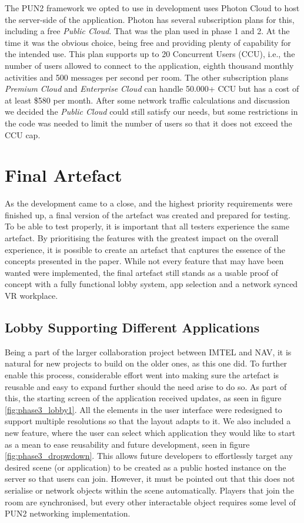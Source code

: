 The PUN2 framework we opted to use in development uses Photon Cloud to host the server-side of the application. Photon has several subscription plans for this, including a free \textit{Public Cloud}. That was the plan used in phase 1 and 2. At the time it was the obvious choice, being free and providing plenty of capability for the intended use. This plan supports up to 20 Concurrent Users (CCU), i.e., the number of users allowed to connect to the application, eighth thousand monthly activities and 500 messages per second per room. The other subscription plans \textit{Premium Cloud} and \textit{Enterprise Cloud} can handle 50.000+ CCU but has a cost of at least \$580 per month. After some network traffic calculations and discussion we decided the \textit{Public Cloud} could still satisfy our needs, but some restrictions in the code was needed to limit the number of users so that it does not exceed the CCU cap. 





\section{Final Artefact}
As the development came to a close, and the highest priority requirements were finished up, a final version of the artefact was created and prepared for testing. To be able to test properly, it is important that all testers experience the same artefact. By prioritising the features with the greatest impact on the overall experience, it is possible to create an artefact that captures the essence of the concepts presented in the paper. While not every feature that may have been wanted were implemented, the final artefact still stands as a usable proof of concept with a fully functional lobby system, app selection and a network synced VR workplace.


\subsection{Lobby Supporting Different Applications}
\label{section:lobbySystem}
Being a part of the larger collaboration project between IMTEL and NAV, it is natural for new projects to build on the older ones, as this one did. To further enable this process, considerable effort went into making sure the artefact is reusable and easy to expand further should the need arise to do so. As part of this, the starting screen of the application received updates, as seen in figure \ref{fig:phase3_lobby1}. All the elements in the user interface were redesigned to support multiple resolutions so that the layout adapts to it.  
We also included a new feature, where the user can select which application they would like to start as a mean to ease reusability and future development, seen in figure \ref{fig:phase3_dropwdown}. This allows future developers to effortlessly target any desired scene (or application) to be created as a public hosted instance on the server so that users can join. 
However, it must be pointed out that this does not serialise or network objects within the scene automatically. Players that join the room are synchronised, but every other interactable object requires some level of PUN2 networking implementation. 
    

